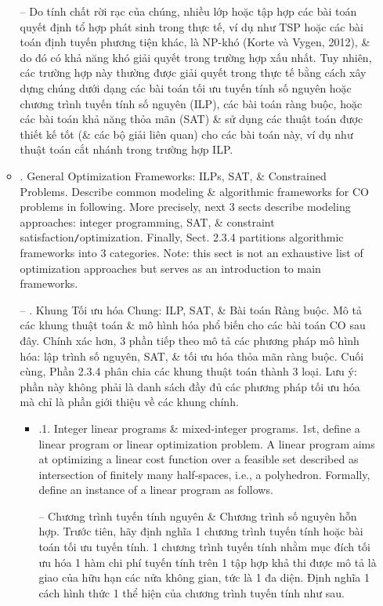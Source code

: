 \documentclass{article}
\begin{document}
\begin{itemize}
\begin{itemize}
        -- Do tính chất rời rạc của chúng, nhiều lớp hoặc tập hợp các bài toán quyết định tổ hợp phát sinh trong thực tế, ví dụ như TSP hoặc các bài toán định tuyến phương tiện khác, là NP-khó (Korte và Vygen, 2012), \& do đó có khả năng khó giải quyết trong trường hợp xấu nhất. Tuy nhiên, các trường hợp này thường được giải quyết trong thực tế bằng cách xây dựng chúng dưới dạng các bài toán tối ưu tuyến tính số nguyên hoặc chương trình tuyến tính số nguyên (ILP), các bài toán ràng buộc, hoặc các bài toán khả năng thỏa mãn (SAT) \& sử dụng các thuật toán được thiết kế tốt (\& các bộ giải liên quan) cho các bài toán này, ví dụ như thuật toán cắt nhánh trong trường hợp ILP.
        \item {. General Optimization Frameworks: ILPs, SAT, \& Constrained Problems.} Describe common modeling \& algorithmic frameworks for CO problems in following. More precisely, next 3 sects describe modeling approaches: integer programming, SAT, \& constraint satisfaction{\tt/}optimization. Finally, Sect. 2.3.4 partitions algorithmic frameworks into 3 categories. Note: this sect is not an exhaustive list of optimization approaches but serves as an introduction to main frameworks.

        -- {\sf. Khung Tối ưu hóa Chung: ILP, SAT, \& Bài toán Ràng buộc.} Mô tả các khung thuật toán \& mô hình hóa phổ biến cho các bài toán CO sau đây. Chính xác hơn, 3 phần tiếp theo mô tả các phương pháp mô hình hóa: lập trình số nguyên, SAT, \& tối ưu hóa thỏa mãn ràng buộc. Cuối cùng, Phần 2.3.4 phân chia các khung thuật toán thành 3 loại. Lưu ý: phần này không phải là danh sách đầy đủ các phương pháp tối ưu hóa mà chỉ là phần giới thiệu về các khung chính.
        \begin{itemize}
            \item {.1. Integer linear programs \& mixed-integer programs.} 1st, define a linear program or linear optimization problem. A linear program aims at optimizing a linear cost function over a feasible set described as intersection of finitely many half-spaces, i.e., a polyhedron. Formally, define an instance of a linear program as follows.

            -- {\sf Chương trình tuyến tính nguyên \& Chương trình số nguyên hỗn hợp.} Trước tiên, hãy định nghĩa 1 chương trình tuyến tính hoặc bài toán tối ưu tuyến tính. 1 chương trình tuyến tính nhằm mục đích tối ưu hóa 1 hàm chi phí tuyến tính trên 1 tập hợp khả thi được mô tả là giao của hữu hạn các nửa không gian, tức là 1 đa diện. Định nghĩa 1 cách hình thức 1 thể hiện của chương trình tuyến tính như sau.


\end{itemize}
\end{itemize}
\end{itemize}
\end{document}
